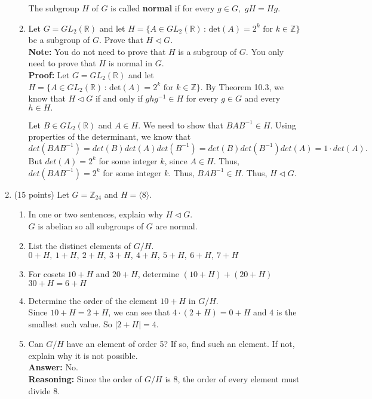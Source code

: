 \documentclass[12pt]{article}
\renewcommand{\emph}[1]{\textsf{\textbf{#1}}}
\newcommand{\bbZ}{\mathbb{Z}}
\newcommand{\bbR}{\mathbb{R}}
\begin{document}
\begin{enumerate}
\begin{enumerate}
	The subgroup $H$ of $G$ is called \emph{normal} if for every $g \in G,$ $gH=Hg.$
	\vfill
	\item Let $G=GL_2(\bbR)$ and let $H=\{ A \in GL_2(\bbR) \,  : \, \text{det}(A)=2^k \text{ for } k \in \bbZ\}$ be a subgroup of $G.$ Prove that $H \lhd G.$ \\
	\emph{Note:} You do not need to prove that $H$ is a subgroup of $G.$ You only need to prove that $H$ is normal in $G.$\\
	
	\textbf{Proof:} Let $G=GL_2(\bbR)$ and let $H=\{ A \in GL_2(\bbR) \,  : \, \text{det}(A)=2^k \text{ for } k \in \bbZ\}.$ By Theorem 10.3, we know that $H \lhd G$ if and only if $ghg^{-1} \in H$ for every $g \in G$ and every $h \in H.$ 
	
	Let $B \in GL_2(\bbR)$ and $A \in H.$ We need to show that $BAB^{-1} \in H.$ Using properties of the determinant, we know that 
	$$det(BAB^{-1})=det(B)det(A)det(B^{-1})=det(B)det(B^{-1})det(A)=1 \cdot det(A).$$
	But $det(A)=2^k$ for some integer $k$, since $A \in H.$ Thus, $det(BAB^{-1})=2^k$ for some integer $k.$ Thus, $BAB^{-1} \in H.$ Thus, $H \lhd G.$
	\vfill
	\end{enumerate} 

\newpage

\item (15 points) Let $G=\bbZ_{24}$ and $H=\langle 8 \rangle.$
	\begin{enumerate}
	\item In one or two sentences, explain why $H \lhd G.$\\
	
	
	$G$ is abelian so all subgroups of $G$ are normal.\\
	
	\item List the distinct elements of $G/H.$\\
	
	$0+H,\: 1+H,\:2+H,\:3+H,\:	4+H,\:5+H,\:6+H,\:7+H$\\
	
	\item For cosets $10+H$ and $20 +H$, determine $(10+H)+(20+H)$\\
	
	$30+H=6+H$\\
	
	\item Determine the order of the element $10 + H$ in $G/H.$\\
	
	Since $10 + H=2+H$, we can see that $4 \cdot (2+H)=0+H$ and $4$ is the smallest such value. So $|2+H|=4.$\\
	
	\item Can $G/H$ have an element of order 5? If so, find such an element. If not, explain why it is not possible.\\
	
	\textbf{Answer:} No.\\
	\textbf{Reasoning:} Since the order of $G/H$ is 8, the order of every element must divide $8.$
	\end{enumerate}

\end{enumerate}
\end{document}
